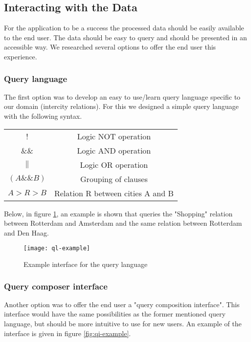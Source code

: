 \subsection{Interacting with the Data}

For the application to be a success the processed data should be easily available to the end user. The data should be easy to query and should be presented in an accessible way.
We researched several options to offer the end user this experience.

\subsubsection{Query language}

The first option was to develop an easy to use/learn query language specific to our domain (intercity relations). For this we designed a simple query language with the following syntax.

\begin{center}
\begin{tabular}{ |c|c| } 
 \hline
 ! & Logic NOT operation \\
 \&\& & Logic AND operation \\ 
 $\|$ & Logic OR operation \\ 
 $( A \&\& B )$ & Grouping of clauses \\
 $A > R > B$ & Relation R between cities A and B \\
 \hline
\end{tabular}
\end{center}

Below, in figure \ref{fig:ql-example}, an example is shown that queries the "Shopping" relation between Rotterdam and Amsterdam and the same relation between Rotterdam and Den Haag.

\begin{figure}[ht]
\centering
\texttt{[image: ql-example]}
\caption{Example interface for the query language}
\label{fig:ql-example}
\end{figure}

\subsubsection{Query composer interface}

Another option was to offer the end user a "query composition interface". This interface would have the same possibilities as the former mentioned query language, but should be more intuitive to use for new users. An example of the interface is given in figure \ref{fig:qi-example}.

